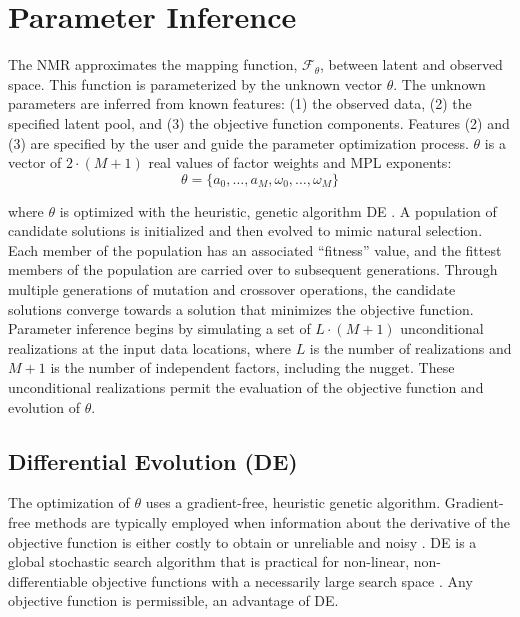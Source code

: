 \FloatBarrier
\section{Parameter Inference}
\label{sec:04paraminfer}

The \gls{NMR} approximates the mapping function, $\mathcal{F}_{\theta}$, between latent and observed space. This function is parameterized by the unknown vector $\theta$. The unknown parameters are inferred from known features: (1) the observed data, (2) the specified latent pool, and (3) the objective function components. Features (2) and (3) are specified by the user and guide the parameter optimization process. $\theta$ is a vector of $2 \cdot (M+1)$ real values of factor weights and \gls{MPL} exponents:
\begin{equation}
    \theta = \{ a_{0}, \dots, a_{M}, \omega_{0}, \dots, \omega_{M} \}
    \label{eq:theta}
\end{equation}

\lowercase{Where} $\theta$ is optimized with the heuristic, genetic algorithm \gls{DE} \citep{price2013differential}. A population of candidate solutions is initialized and then evolved to mimic natural selection. Each member of the population has an associated ``fitness'' value, and the fittest members of the population are carried over to subsequent generations. Through multiple generations of mutation and crossover operations, the candidate solutions converge towards a solution that minimizes the objective function. Parameter inference begins by simulating a set of $L \cdot (M+1)$ unconditional realizations at the input data locations, where $L$ is the number of realizations and $M+1$ is the number of independent factors, including the nugget. These unconditional realizations permit the evaluation of the objective function and evolution of $\theta$.

\subsection{Differential Evolution (DE)}
\label{subsec:04de}

The optimization of $\theta$ uses a gradient-free, heuristic genetic algorithm. Gradient-free methods are typically employed when information about the derivative of the objective function is either costly to obtain or unreliable and noisy \citep{conn2009introduction}. \Acrfull{DE} is a global stochastic search algorithm that is practical for non-linear, non-differentiable objective functions with a necessarily large search space \citep{rios2013derivativefree}. Any objective function is permissible, an advantage of \gls{DE}.

